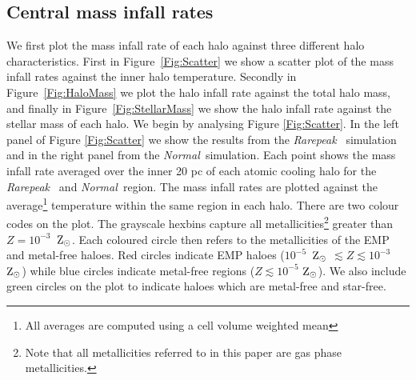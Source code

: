 \documentclass[twocolumn,iop,revtex4]{openjournal}
\newcommand{\zsolar} {$\rm{Z_{\odot}}~$}
\newcommand{\zsolarc} {$\rm{Z_{\odot}}$}
\newcommand{\rarepeak} {\textit{Rarepeak~}}
\newcommand{\normal} {\textit{Normal~}}
\begin{document}
\subsection{Central mass infall rates}

\indent We first plot the mass infall rate of each halo against three different halo
characteristics. First in Figure~\ref{Fig:Scatter} we show a scatter plot of the mass infall rates
against the inner halo temperature. Secondly in Figure~\ref{Fig:HaloMass} we plot the halo infall
rate against the total halo mass, and finally in Figure~\ref{Fig:StellarMass} we show the halo
infall rate against the stellar mass of each halo. We begin by analysing Figure \ref{Fig:Scatter}. 
In the left panel of Figure \ref{Fig:Scatter} we show the results from the \rarepeak
simulation and in the right panel from the \normal simulation. Each point shows the mass
infall rate averaged over the inner 20 pc of each atomic cooling halo for the \rarepeak
and \normal region. The mass infall rates are plotted against the average\footnote{All
  averages are computed using a cell volume weighted mean} temperature within
the same region in each halo. There are two colour codes on the plot. The grayscale
hexbins capture all metallicities\footnote{Note that all metallicities
  referred to in this paper are gas phase metallicities.}
greater than $Z = 10^{-3}$~\zsolarc. Each coloured circle then refers to
the metallicities of the EMP and metal-free haloes. Red circles indicate EMP haloes
 ($10^{-5}$~\zsolar $ \lesssim Z \lesssim 10^{-3}$~\zsolarc)
while blue circles indicate metal-free regions  ($Z \lesssim 10^{-5}$ \zsolarc). We also
include green circles on the plot to indicate haloes which are metal-free and star-free. 
\end{document}
